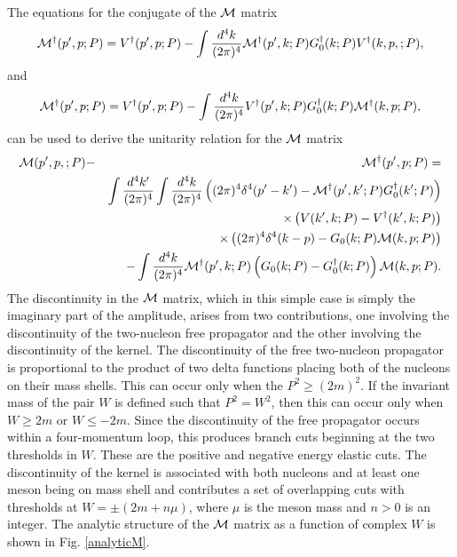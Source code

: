 \documentclass[mythesis.tex]{subfiles}
\begin{document}
The equations for the conjugate of the $\cal M$ matrix
%
\begin{equation}
{\cal M}^\dagger (p',p;P)=V^\dagger (p',p;P)-\int\frac{d^4k}{(2\pi)^4}
{\cal M}^\dagger (p',k;P)
G_0^\dagger(k;P) V^\dagger(k,p,;P),\label{BStC}
\end{equation}
%
and
%
\begin{equation}
{\cal M}^\dagger(p',p;P)=V^\dagger (p',p;P)-\int\frac{d^4k}{(2\pi)^4}
V^\dagger (p',k;P) G_0^\dagger (k;P)
{\cal M}^\dagger (k,p;P),\label{BStCA}
\end{equation}
%
can be used to derive the unitarity relation for the $\cal M$ matrix
%
\begin{eqnarray}
{\cal M}(p',p,;P)&-&{\cal M}^\dagger (p',p;P)= \nonumber \\
& &\int\frac{d^4k'}{(2\pi)^4}\int\frac{d^4k}{(2\pi)^4}\left( (2\pi)^4
\delta^4(p'-k')-{\cal M}^\dagger (p',k';P)G_0^\dagger(k';P)\right) \nonumber\\
& &\times\left( V(k',k;P)-V^\dagger (k',k;P)\right) \nonumber \\
& &\times\left( (2\pi)^4\delta^4(k-p)-G_0(k;P) {\cal M}(k,p;P)\right) \nonumber\\
& &-\int\frac{d^4k}{(2\pi)^4}{\cal M}^\dagger(p',k;P)
\left( G_0(k;P)-G_0^\dagger (k;P)\right) {\cal M}(k,p;P).\label{unitarity}
\end{eqnarray}
%
The discontinuity in the $\cal M$ matrix, which in this simple case is
simply the imaginary part of the amplitude,
arises from two
contributions, one involving the discontinuity of the two-nucleon free
propagator and the other involving the discontinuity of the kernel.
The discontinuity of the free two-nucleon propagator is proportional to
the product of two delta functions placing both of the nucleons on their
mass shells. This can occur only when the $P^2\geq (2m)^2$. If
the invariant mass of the pair $W$ is defined such that $P^2=W^2$, then
this can occur only when $W\geq 2m$ or $W\leq -2m$. Since the discontinuity
of the free propagator occurs within a four-momentum loop, this
produces branch cuts beginning at the two thresholds in $W$. These are
the positive and negative energy elastic cuts. The discontinuity of the
kernel is associated with both nucleons and at least one meson being on
mass shell and contributes a set of overlapping cuts with thresholds at
$W=\pm (2 m + n \mu)$, where $\mu$ is the meson mass and $n>0$ is an integer.
The analytic structure of the  $\cal M$ matrix as a function of complex
$W$ is shown in Fig. \ref{analyticM}.
%
\end{document}
